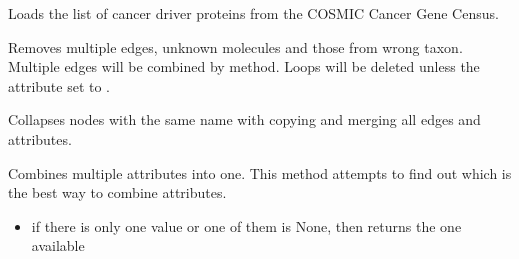 \documentclass[letterpaper,10pt,english]{sphinxmanual}
\begin{document}
\begin{fulllineitems}
\begin{fulllineitems}
\begin{description}
\end{description}

\end{fulllineitems}


\begin{fulllineitems}
\label{\detokenize{main:pypath.main.PyPath.cancer_gene_census_list}}
Loads the list of cancer driver proteins from the COSMIC Cancer
Gene Census.

\end{fulllineitems}


\begin{fulllineitems}
\label{\detokenize{main:pypath.main.PyPath.clean_graph}}
Removes multiple edges, unknown molecules and those from wrong taxon.
Multiple edges will be combined by  method.
Loops will be deleted unless the  attribute set to .

\end{fulllineitems}


\begin{fulllineitems}
\label{\detokenize{main:pypath.main.PyPath.collapse_by_name}}
Collapses nodes with the same name with copying and merging
all edges and attributes.

\end{fulllineitems}


\begin{fulllineitems}
\label{\detokenize{main:pypath.main.PyPath.combine_attr}}
Combines multiple attributes into one. This method attempts
to find out which is the best way to combine attributes.
\begin{itemize}
\item {} 
if there is only one value or one of them is None, then returns
the one available


\end{itemize}
\end{fulllineitems}
\end{fulllineitems}
\end{document}
